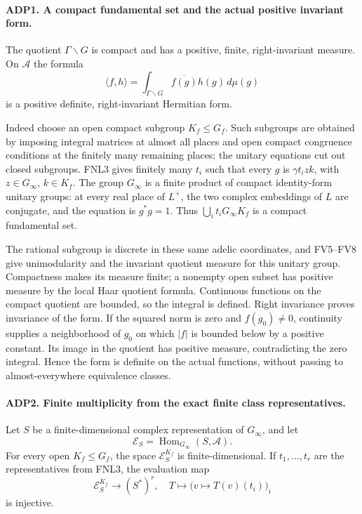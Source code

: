 \paragraph{ADP1. A compact fundamental set and the actual positive invariant form.}
\label{claim:ADP1}
The quotient \(\Gamma\backslash G\) is compact and has a positive,
finite, right-invariant measure.  On \(\mathcal A\) the formula
\[
       \langle f,h\rangle
       =\int_{\Gamma\backslash G}\overline{f(g)}h(g)\,d\mu(g)
\]
is a positive definite, right-invariant Hermitian form.

Indeed choose an open compact subgroup \(K_f\le G_f\).  Such subgroups
are obtained by imposing integral matrices at almost all places and open
compact congruence conditions at the finitely many remaining places; the
unitary equations cut out closed subgroups.  FNL3 gives finitely many
\(t_i\) such that every \(g\) is \(\gamma t_i z k\), with
\(z\in G_\infty\), \(k\in K_f\).  The group \(G_\infty\) is a
finite product of compact identity-form unitary groups: at every real
place of \(L^+\), the two complex embeddings of \(L\) are conjugate,
and the equation is \(g^*g=1\).  Thus
\(\bigcup_it_iG_\infty K_f\) is a compact fundamental set.

The rational subgroup is discrete in these same adelic coordinates,
and FV5--FV8 give unimodularity and the invariant quotient measure for
this unitary group.  Compactness makes its measure finite; a nonempty
open subset has positive measure by the local Haar quotient formula.
Continuous functions on the compact quotient are bounded, so the
integral is defined.  Right invariance proves invariance of the form.
If the squared norm is zero and \(f(g_0)\ne0\), continuity supplies
a neighborhood of \(g_0\) on which \(|f|\) is bounded below by a
positive constant.  Its image in the quotient has positive measure,
contradicting the zero integral.  Hence the form is definite on the
actual functions, without passing to almost-everywhere equivalence classes.

\paragraph{ADP2. Finite multiplicity from the exact finite class representatives.}
\label{claim:ADP2}
Let \(S\) be a finite-dimensional complex representation of
\(G_\infty\), and let
\[
 \mathcal E_S=\operatorname{Hom}_{G_\infty}(S,\mathcal A).
\]
For every open \(K_f\le G_f\), the space \(\mathcal E_S^{K_f}\)
is finite-dimensional.  If \(t_1,\ldots,t_r\) are the representatives
from FNL3, the evaluation map
\[
 \mathcal E_S^{K_f}\longrightarrow (S^*)^r,
       \quad T\longmapsto\bigl(v\mapsto T(v)(t_i)\bigr)_i
\]
is injective.

